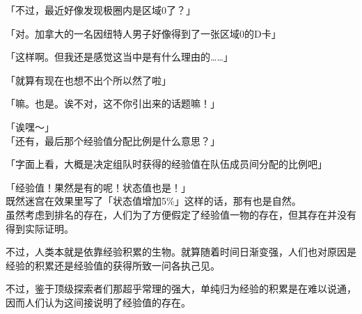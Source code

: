 「不过，最近好像发现极圈内是区域0了？」

「对。加拿大的一名因纽特人男子好像得到了一张区域0的D卡」

「这样啊。但我还是感觉这当中是有什么理由的……」

「就算有现在也想不出个所以然了啦」

「嘛。也是。诶不对，这不你引出来的话题嘛！」

「诶嘿～」\\

「还有，最后那个经验值分配比例是什么意思？」

「字面上看，大概是决定组队时获得的经验值在队伍成员间分配的比例吧」

「经验值！果然是有的呢！状态值也是！」\\

既然迷宫在效果里写了「状态值增加5\%」这样的话，那有也是自然。\\

虽然考虑到排名的存在，人们为了方便假定了经验值一物的存在，但其存在并没有得到实际证明。

不过，人类本就是依靠经验积累的生物。就算随着时间日渐变强，人们也对原因是经验的积累还是经验值的获得所致一问各执己见。

不过，鉴于顶级探索者们那超乎常理的强大，单纯归为经验的积累是在难以说通，因而人们认为这间接说明了经验值的存在。\\


